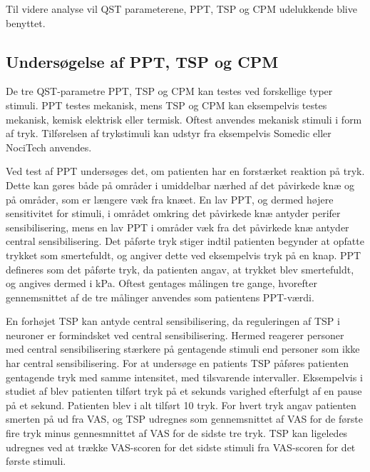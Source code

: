 Til videre analyse vil QST parameterene, PPT, TSP og CPM udelukkende blive benyttet.

\subsection{Undersøgelse af PPT, TSP og CPM}
De tre QST-parametre PPT, TSP og CPM kan testes ved forskellige typer stimuli. PPT testes mekanisk, mens TSP og CPM kan eksempelvis testes mekanisk, kemisk elektrisk eller termisk. Oftest anvendes mekanisk stimuli i form af tryk. \citep{Suokas2012} \citep{Yarnitsky2006} Tilførelsen af trykstimuli kan udstyr fra eksempelvis Somedic eller NociTech anvendes. \citep{Wylde2015} \citep{Petersen2016} 

Ved test af PPT undersøges det, om patienten har en forstærket reaktion på tryk. Dette kan gøres både på områder i umiddelbar nærhed af det påvirkede knæ og på områder, som er længere væk fra knæet. En lav PPT, og dermed højere sensitivitet for stimuli, i området omkring det påvirkede knæ antyder perifer sensibilisering, mens en lav PPT i områder væk fra det påvirkede knæ antyder central sensibilisering. \citep{Suokas2012} Det påførte tryk stiger indtil patienten begynder at opfatte trykket som smertefuldt, og angiver dette ved eksempelvis tryk på en knap. PPT defineres som det påførte tryk, da patienten angav, at trykket blev smertefuldt, og angives dermed i kPa. Oftest gentages målingen tre gange, hvorefter gennemsnittet af de tre målinger anvendes som patientens PPT-værdi. \citep{Petersen2015b} \citep{Wylde2015} 

En forhøjet TSP kan antyde central sensibilisering, da reguleringen af TSP i neuroner er formindsket ved central sensibilisering. \citep{Arendt-Nielsen2015b} Hermed reagerer personer med central sensibilisering stærkere på gentagende stimuli end personer som ikke har central sensibilisering. \citep{Arendt-Nielsen2015b} For at undersøge en patients TSP påføres patienten gentagende tryk med samme intensitet, med tilsvarende intervaller. Eksempelvis i studiet af \citep{Petersen2016} blev patienten tilført tryk på et sekunds varighed efterfulgt af en pause på et sekund. Patienten blev i alt tilført 10 tryk. For hvert tryk angav patienten smerten på ud fra VAS, og TSP udregnes som gennemsnittet af VAS for de første fire tryk minus gennesmnittet af VAS for de sidste tre tryk. \citep{Petersen2016} TSP kan ligeledes udregnes ved at trække VAS-scoren for det sidste stimuli fra VAS-scoren for det første stimuli. \citep{Petersen2015b} 

